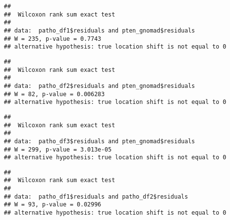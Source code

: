 \documentclass[
]{article}
\newenvironment{Shaded}{\begin{snugshade}}{\end{snugshade}}
\newcommand{\CommentTok}[1]{\textcolor[rgb]{0.56,0.35,0.01}{\textit{#1}}}
\newcommand{\FunctionTok}[1]{\textcolor[rgb]{0.13,0.29,0.53}{\textbf{#1}}}
\newcommand{\NormalTok}[1]{#1}
\newcommand{\SpecialCharTok}[1]{\textcolor[rgb]{0.81,0.36,0.00}{\textbf{#1}}}
\begin{document}
\begin{verbatim}
## 
##  Wilcoxon rank sum exact test
## 
## data:  patho_df1$residuals and pten_gnomad$residuals
## W = 235, p-value = 0.7743
## alternative hypothesis: true location shift is not equal to 0
\end{verbatim}

\begin{Shaded}
\end{Shaded}

\begin{verbatim}
## 
##  Wilcoxon rank sum exact test
## 
## data:  patho_df2$residuals and pten_gnomad$residuals
## W = 82, p-value = 0.006283
## alternative hypothesis: true location shift is not equal to 0
\end{verbatim}

\begin{Shaded}
\end{Shaded}

\begin{verbatim}
## 
##  Wilcoxon rank sum exact test
## 
## data:  patho_df3$residuals and pten_gnomad$residuals
## W = 299, p-value = 3.013e-05
## alternative hypothesis: true location shift is not equal to 0
\end{verbatim}

\begin{Shaded}
\end{Shaded}

\begin{verbatim}
## 
##  Wilcoxon rank sum exact test
## 
## data:  patho_df1$residuals and patho_df2$residuals
## W = 93, p-value = 0.02996
## alternative hypothesis: true location shift is not equal to 0
\end{verbatim}
\end{document}
